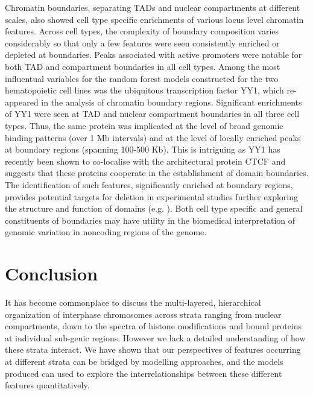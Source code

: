 \documentclass[a4paper,10pt,oneside]{book}
\begin{document}
Chromatin boundaries, separating TADs and nuclear compartments at
different scales, also showed cell type specific enrichments of
various locus level chromatin features. Across cell types, the
complexity of boundary composition varies considerably so that only a
few features were seen consistently enriched or depleted at
boundaries. Peaks associated with active promoters were notable for
both TAD and compartment boundaries in all cell types. Among the most
influentual variables for the random forest models constructed for the
two hematopoietic cell lines was the ubiquitous transcription factor
YY1, which re-appeared in the analysis of chromatin boundary
regions. Significant enrichments of YY1 were seen at TAD and nuclear
compartment boundaries in all three cell types. Thus, the same protein
was implicated at the level of broad genomic binding patterns (over 1
Mb intervals) and at the level of locally enriched peaks at boundary
regions (spanning 100-500 Kb). This is intriguing as YY1 has recently
been shown to co-localise with the architectural protein
CTCF \cite{Ong2014} and suggests that these proteins cooperate in the
establishment of domain boundaries. The identification of such
features, significantly enriched at boundary regions, provides
potential targets for deletion in experimental studies further
exploring the structure and function of domains
(e.g. \cite{Nora2012}). Both cell type specific and general
constituents of boundaries may have utility in the biomedical
interpretation of genomic variation in noncoding regions of the
genome.

\section{Conclusion}

It has become commonplace to discuss the multi-layered, hierarchical
organization of interphase chromosomes across strata ranging from
nuclear compartments, down to the spectra of histone modifications and
bound proteins at individual sub-genic regions. However we lack a
detailed understanding of how these strata interact. We have shown
that our perspectives of features occurring at different strata can be
bridged by modelling approaches, and the models produced can used to
explore the interrelationships between these different features
quantitatively. 
\end{document}
